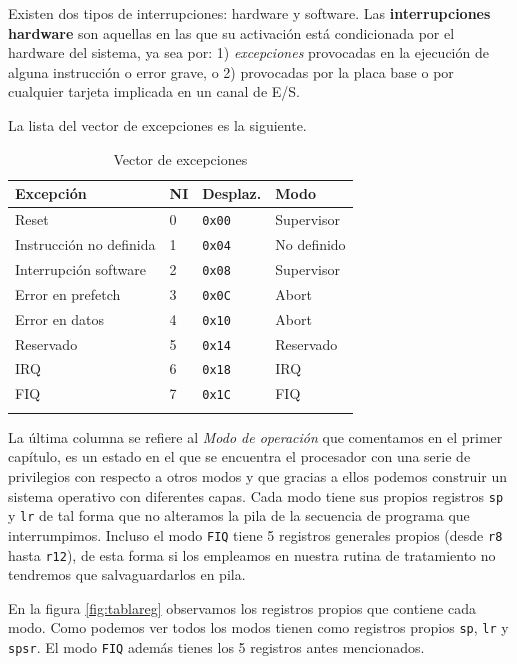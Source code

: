 Existen dos tipos de interrupciones: hardware y software. Las {\bf
interrupciones hardware} son aquellas en las que su activación está
condicionada por el hardware del sistema, ya sea por: 1) {\it
excepciones} provocadas en la ejecución de alguna instrucción o error
grave, o 2) provocadas por la placa base o por cualquier tarjeta
implicada en un canal de E/S.

\noindent La lista del vector de excepciones es la siguiente.

\begin{longtable}{ p{5cm} | p{1cm} | p{2cm} | p{4cm}}
\hline
{\bf Excepción} & {\bf NI} & {\bf Desplaz.} & {\bf Modo} \\ \hline
Reset                   & 0 & {\tt 0x00} & Supervisor \\ \hline
Instrucción no definida & 1 & {\tt 0x04} & No definido \\ \hline
Interrupción software   & 2 & {\tt 0x08} & Supervisor \\ \hline
Error en prefetch       & 3 & {\tt 0x0C} & Abort \\ \hline
Error en datos          & 4 & {\tt 0x10} & Abort \\ \hline
Reservado               & 5 & {\tt 0x14} & Reservado \\ \hline
IRQ                     & 6 & {\tt 0x18} & IRQ \\ \hline
FIQ                     & 7 & {\tt 0x1C} & FIQ \\ \hline
\label{tab:excepciones}
\caption{Vector de excepciones}
\end{longtable}

La última columna se refiere al {\it Modo de operación} que comentamos en el primer
capítulo, es un estado en el que se encuentra el procesador con una serie de privilegios
con respecto a otros modos y que gracias a ellos podemos construir un sistema operativo
con diferentes capas. Cada modo tiene sus propios registros {\tt sp} y {\tt lr} de tal
forma que no alteramos la pila de la secuencia de programa que interrumpimos. Incluso
el modo {\tt FIQ} tiene 5 registros generales propios (desde {\tt r8} hasta {\tt r12}),
de esta forma si los empleamos en nuestra rutina de tratamiento no tendremos que
salvaguardarlos en pila.

En la figura \ref{fig:tablareg} observamos los registros propios que contiene cada modo.
Como podemos ver todos los modos tienen como registros propios {\tt sp}, {\tt lr} y {\tt spsr}.
El modo {\tt FIQ} además tienes los 5 registros antes mencionados.

